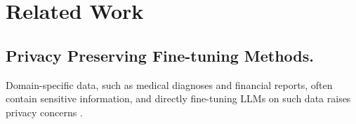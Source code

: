 \section{Related Work}

\subsection{Privacy Preserving Fine-tuning Methods.}
Domain-specific data, such as medical diagnoses and financial reports, often contain sensitive information, and directly fine-tuning LLMs on such data raises privacy concerns \citep{Mokhtarabadi2024EmpoweringPL, Wang2023HowFC, Jang2023ExploringTB}. 
